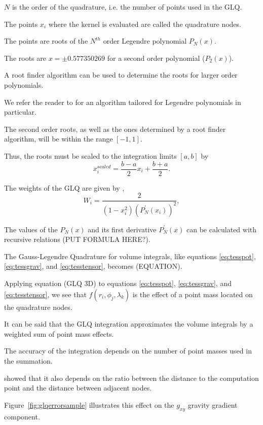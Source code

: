 \documentclass[paper,twocolumn]{geophysics}
\begin{document}
$N$ is the order of the quadrature, i.e. the number of points used in the GLQ.

The points $x_i$ where the kernel is evaluated are called the quadrature nodes.

The points are roots of the $N^{th}$ order Legendre polynomial $P_N(x)$.

The roots are $x = \pm 0.577350269$ for a second order polynomial ($P_2(x)$).

A root finder algorithm can be used to determine the roots for larger order
polynomials.

We refer the reader to \citet{Barrera-Figueroa2006} for an algorithm tailored
for Legendre polynomials in particular.

The second order roots, as well as the ones determined by a root finder
algorithm, will be within the range $[-1, 1]$.

Thus, the roots must be scaled to the integration limits $[a, b]$ by
\begin{equation}
    x^{scaled}_i = \frac{b - a}{2} x_i + \frac{b + a}{2}.
\end{equation}

The weights of the GLQ are given by \citep{Hildebrand1987},
\begin{equation}
    W_i = \frac{2}{(1 - x_i^2)(P^\prime_N(x_i))^2},
\end{equation}

The values of the $P_N(x)$ and its first derivative $P^\prime_N(x)$ can be
calculated with recursive relations (PUT FORMULA HERE?).

The Gauss-Legendre Quadrature for volume integrals, like equations
\ref{eq:tesspot}, \ref{eq:tessgrav}, and \ref{eq:tesstensor},
becomes \citep{Asgharzadeh2007} (EQUATION).

Applying equation (GLQ 3D) to equations
\ref{eq:tesspot}, \ref{eq:tessgrav}, and \ref{eq:tesstensor},
we see that $f(r_i, \phi_j, \lambda_k)$ is the effect of a point
mass located on the quadrature nodes.

It can be said that the GLQ integration approximates the volume integrals  by a
weighted sum of point mass effects.


The accuracy of the integration
depends on the number of point masses used in the summation.

\citet{Ku1977} showed that it also depends on the ratio between
the distance to the computation point and the distance between adjacent nodes.

Figure~\ref{fig:glqerrorsample}
illustrates this effect on the $g_{xy}$ gravity gradient component.
\end{document}
